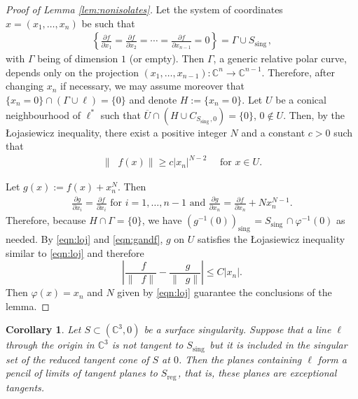 \documentclass[12pt]{amsart}
\newtheorem{corollary}[theorem]{Corollary}
\theoremstyle{definition}
\numberwithin{equation}{section}
\newcommand{\C}{\mathbb{C}}
\DeclareMathOperator{\sing}{sing \, }
\DeclareMathOperator{\reg}{reg\,}
\DeclareMathOperator{\grad}{grad{}}
\begin{document}
  \begin{proof}[Proof of Lemma \ref{lem:nonisolates}] 
Let the system of coordinates $x=(x_1, \ldots , x_n)$ be such that  
\begin{align}\label{eqn:polar}
\left \{ \frac{\partial f}{\partial x_1}= \frac{\partial f}{\partial x_2}
= \cdots =\frac{\partial f}{\partial x_{n-1} }=0 \right \} = \Gamma \cup 
S_{\sing}, %
\end{align} 
with $\Gamma$ being of dimension $1$ (or empty).  Then $\Gamma$, a generic relative polar curve,  depends only on the projection $(x_1, \ldots , x_{n-1}) : \C^n \to \C^{n-1}$.  Therefore, after changing $x_n$ if necessary, we may assume moreover that $\{x_n=0\} \cap (\Gamma \cup \ell) = \{0\}$ and   
denote $H:=\{x_n=0\}$.  
Let $U$ be a conical neighbourhood of $\ell^*$ such that  $\overline U \cap (H\cup C_{S_{\sing},0}) = \{0\}$, $0\notin U$.  Then, by the {\L}ojasiewicz inequality, there exist a positive integer $N$ and a constant $c>0$ such that 
\begin{align}\label{eqn:loj}
\|\grad f (x)\| \ge c |x_n|^{N-2} \quad \text { for } x\in U.
\end{align}

Let $g(x):= f(x) + x_n^N$.  Then 
\begin{align}\label{eqn:gandf}
\frac{\partial g}{\partial x_i} = \frac{\partial f}{\partial x_i} \text { for } i= 1, \ldots  ,n-1 
\text { and } \frac{\partial g}{\partial x_n} = \frac{\partial f}{\partial x_n} + Nx_n^{N-1}. 
\end{align}
Therefore, because $H\cap \Gamma = \{0\}$, we have $(g^{-1} (0))_{\sing}= S_{\sing} \cap \varphi^{-1} (0)$ as needed.  By \eqref{eqn:loj} and \eqref{eqn:gandf}, $g$ on $U$ satisfies the {\L}ojasiewicz inequality similar to \eqref{eqn:loj} 
 and therefore 
$$
\left | \frac{\grad f}{\|\grad f\|} -\frac{\grad g}{\|\grad g\|} \right | \le C |x_n| .
$$
Then $\varphi (x) = x_n$ and $N$ given by \eqref{eqn:loj} guarantee  the conclusions of the lemma. 
 \end{proof}

 \begin{corollary}\label{cor:nonisolHL}
Let $S\subset (\C^3,0)$ be a surface singularity. Suppose that a line $\ell$ through the origin in $\C^3$ is not tangent to $S_{\sing}$ but it is included in the singular set of the reduced tangent cone of $S$ at $0$.  
Then the planes containing $\ell$ form a pencil of limits of tangent planes to $S_{\reg}$, that is, these planes are exceptional tangents.  
\end{corollary}
\end{document}
